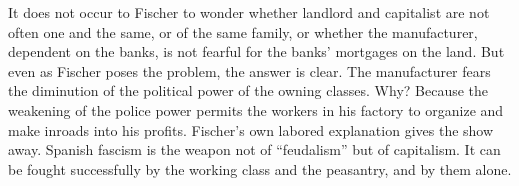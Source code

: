 It does not occur to Fischer to wonder whether landlord and capitalist are not often one and the same, or of the same family, or whether the manufacturer, dependent on the banks, is not fearful for the banks’ mortgages on the land. But even as Fischer poses the problem, the answer is clear. The manufacturer fears the diminution of the political power of the owning classes. Why? Because the weakening of the police power permits the workers in his factory to organize and make inroads into his profits. Fischer’s own labored explanation gives the show away. Spanish fascism is the weapon not of ``feudalism'' but of capitalism. It can be fought successfully by the working class and the peasantry, and by them alone.